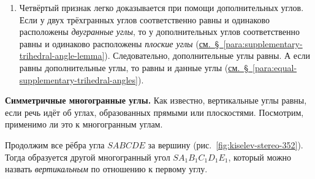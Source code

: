 \begin{enumerate}[label=\arabic*),ref=\arabic*]
    Отложим на всех рёбрах произвольные, но равные отрезки \(SA=SB=SC=S_1A_1=\ldots\) и построим треугольники \(ABC\) и \(A_1B_1C_1\). Из равенства треугольников \(ABS\) и \(A_1B_1S_1\) находим \(AB=A_1B_1\). Подобно этому из равенства других боковых треугольников выводим \(AC=A_1C_1\) и \(BC=B_1C_1\). Следовательно, \(\triangle ABC=\triangle A_1B_1C_1\). Опустим на плоскости этих треугольников перпендикуляры \(SO\) и \(S_1O_1\). Так как наклонные \(SA,SB\) и \(SC\) равны, то должны быть равны их проекции \(OA,OB\) и \(OC\). Значит, точка \(O\) --- центр окружности, описанной около треугольника \(ABC\). Точно
    так же точка \(O_1\) --- центр окружности, описанной около треугольника \(A_1B_1C_1\). У равных треугольников радиусы описанных окружностей равны. Значит, \(OB=O_1B_1\). Поэтому \(\triangle SBO=\triangle S_1B_1O_1\) (по гипотенузе и катету), и, следовательно, \(OS=O_1S_1\). Наложим теперь фигуру \(S_1A_1B_1C_1\) на фигуру \(SABC\) так, чтобы равные треугольники \(A_1B_1C_1\) и \(ABC\) совместились. Тогда совместятся описанные окружности и, следовательно, их центры \(O_1\) и \(O\). Вследствие этого перпендикуляр \(O_1S_1\) пойдёт по \(OS\), и точка \(S_1\) совпадёт с \(S\). Таким образом, трёхгранные углы совместятся всеми своими рёбрами. Значит, они равны.

    \item Четвёртый признак легко доказывается при помощи дополнительных углов. Если у двух трёхгранных углов соответственно равны и одинаково расположены \emph{двугранные углы}, то у дополнительных углов соответственно равны и одинаково расположены \emph{плоские углы} (\hyperref[para:supplementary-trihedral-angle-lemma]{см.~§~\ref*{para:supplementary-trihedral-angle-lemma}}). Следовательно, дополнительные углы равны. А если равны дополнительные углы, то равны и данные углы (\hyperref[para:equal-supplementary-trihedral-angles]{см.~§~\ref*{para:equal-supplementary-trihedral-angles}}).
\end{enumerate}

 \textbf{Симметричные многогранные углы.} Как известно, вертикальные углы равны, если речь идёт об углах, образованных прямыми или плоскостями. Посмотрим, применимо ли это к многогранным углам.

Продолжим все рёбра угла \(SABCDE\) за вершину (рис.~\ref{fig:kiselev-stereo-352}). Тогда образуется другой многогранный угол \(SA_1B_1C_1D_1E_1\), который можно назвать \emph{вертикальным} по отношению к первому углу.

